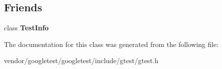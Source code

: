 \subsection*{Friends}
\begin{DoxyCompactItemize}
\item 
class {\bfseries Test\+Info}\hypertarget{classtesting_1_1Test_a4c49c2cdb6c328e6b709b4542f23de3c}{}\label{classtesting_1_1Test_a4c49c2cdb6c328e6b709b4542f23de3c}

\end{DoxyCompactItemize}


The documentation for this class was generated from the following file\+:\begin{DoxyCompactItemize}
\item 
vendor/googletest/googletest/include/gtest/gtest.\+h\end{DoxyCompactItemize}

